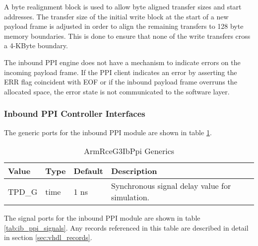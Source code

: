 \documentclass[11pt]{article}
\begin{document}
A byte realignment block is used to allow byte aligned transfer sizes and start addresses. The transfer size of the initial write block at the start 
of a new payload frame is adjusted in order to align the remaining transfers to 128 byte memory boundaries. This is done to ensure that none of the write 
transfers cross a 4-KByte boundary.

The inbound PPI engine does not have a mechanism to indicate errors on the incoming payload frame. If the PPI client indicates an error by asserting the ERR flag 
coincident with EOF or if the inbound payload frame overruns the allocated space, the error state is not communicated to the software layer.

\subsubsection{Inbound PPI Controller Interfaces}

The generic ports for the inbound PPI module are shown in table \ref{tab:ib_ppi_generics}.

\begin{table}[H]
\small
\centering
   \begin{tabular}{| l | l | l | l | }
      \hline \textbf{Value} & \textbf{Type} & \textbf{Default} & \textbf{Description} \\
      \hline TPD\_G          & time     & 1 ns & Synchronous signal delay value for simulation.    \\
      \hline 
   \end{tabular}
   \caption{ArmRceG3IbPpi Generics}
   \label{tab:ib_ppi_generics}
\end{table}

The signal ports for the inbound PPI module are shown in table \ref{tab:ib_ppi_signals}.
Any records referenced in this table are described in detail in section \ref{sec:vhdl_records}. 
\end{document}
